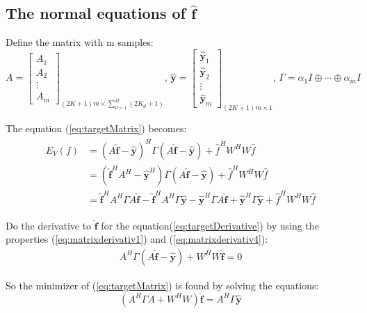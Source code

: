 \documentclass[12pt]{article}
\numberwithin{equation}{section}
\begin{document}
\subsection{The normal equations of $\hat{\bm{f}}$}
Define the matrix with m samples: 
\begin{equation}
	A = 
	\begin{bmatrix}
		A_1 \\ A_2 \\ \vdots \\ A_m
	\end{bmatrix}_{(2K+1)m \times \sum^D_{d=1}(2K_d+1)}
	 \text{,   }
	\hat{\bm{y}}= 
	\begin{bmatrix}
		\hat{\bm{y}}_1 \\ \hat{\bm{y}}_2 \\ \vdots \\ \hat{\bm{y}}_m
	\end{bmatrix}_{(2K+1)m \times 1}
	 \text{,   }
	 \Gamma=\alpha_1 I  \oplus \cdots \oplus \alpha_m I
\end{equation} \par

The equation (\ref{eq:targetMatrix}) becomes:
\begin{align} \begin{split} \label{eq:targetDerivative}
	E_V(f)&=
		(A \hat{\mathbf{f}}-\hat{\mathbf{y}})^H \Gamma (A \hat{\mathbf{f}}-\hat{\mathbf{y}})
		 + \hat{f}^H W^HW \hat{f} \\
		 &= (\hat{\mathbf{f}}^H A^H - \hat{\mathbf{y}}^H)\Gamma (A \hat{\mathbf{f}}-\hat{\mathbf{y}})
		 + \hat{f}^H W^HW \hat{f} \\
		 &= \hat{\mathbf{f}}^H A^H \Gamma A \hat{\mathbf{f}} - \hat{\mathbf{f}}^H A^H \Gamma \hat{\mathbf{y}}
		 - \hat{\mathbf{y}}^H \Gamma A \hat{\mathbf{f}} + \hat{\mathbf{y}}^H \Gamma \hat{\mathbf{y}}
		 + \hat{f}^H W^HW \hat{f} 
\end{split}\end{align} \par
Do the derivative to $\hat{\bm {f}}$ for the equation(\ref{eq:targetDerivative}) by using the properties (\ref{eq:matrixderivativ1}) and (\ref{eq:matrixderivativ4}):
\begin{align}
	A^H \Gamma (A \hat{\bm{f}} - \hat{\bm{y}})  
	+ W^HW\hat{\bm{f}} = 0
\end{align} \par
So the minimizer of (\ref{eq:targetMatrix}) is found by solving the equations:
\begin{equation} \label{eq:normal}
	(A^H \Gamma A + W^H W) \hat{\bm{f}} = A^H \Gamma \hat{\bm{y}}
\end{equation}
\end{document}
